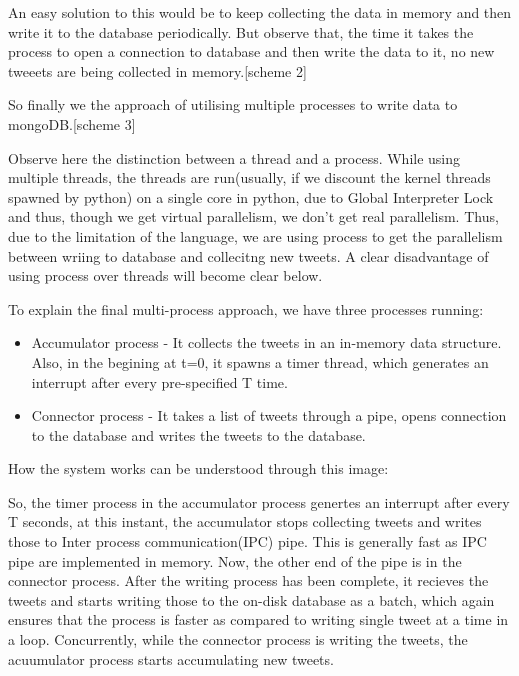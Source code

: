 \documentclass[letterpaper,10pt,english]{sphinxmanual}
\begin{document}
An easy solution to this would be to keep collecting the data in memory and then write it to the database periodically. But observe that, the time it takes the process to open a connection to database and then write the data to it, no new tweeets are being collected in memory.{[}scheme 2{]}

So finally we the approach of utilising multiple processes to write data to mongoDB.{[}scheme 3{]}

Observe here the distinction between a thread and a process.
While using multiple threads, the threads are run(usually, if we discount the kernel threads spawned by python) on a single core in python, due to Global Interpreter Lock and thus, though we get virtual parallelism,
we don’t get real parallelism. Thus, due to the limitation of the language, we are using process to get the parallelism between wriing to database and collecitng new tweets.
A clear disadvantage of using process over threads will become clear below.

To explain the final multi-process approach, we have three processes running:
\begin{itemize}
\item {} 
Accumulator process - It collects the tweets in an in-memory data structure. Also, in the begining at t=0, it spawns a timer thread, which generates an interrupt after every pre-specified T time.

\item {} 
Connector process - It takes a list of tweets through a pipe, opens connection to the database and writes the tweets to the database.

\end{itemize}

How the system works can be understood through this image:

\noindent{}

So, the timer process in the accumulator process genertes an interrupt after every T seconds, at this instant, the accumulator stops collecting tweets and writes those to Inter process communication(IPC) pipe. This is generally fast as IPC pipe are implemented in memory. Now, the other end of the pipe is in the connector process. After the writing process has been complete, it recieves the tweets and starts writing those to the on-disk database as a batch, which again ensures that the process is faster as compared to writing single tweet at a time in a loop. Concurrently, while the connector process is writing the tweets, the acuumulator process starts accumulating new tweets.
\end{document}
